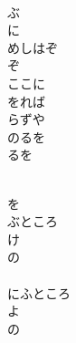 \documentclass[10pt,b5j]{tarticle} %
\begin{document}
\vspace{1.5em} %
\newcommand{\linespace}{0.5em} %
\newcommand{\blocksize}{0.5\hsize} %
\newcommand{\itemmargin}{3em} %
\begin{enumerate} %
    \setlength{\itemindent}{\itemmargin} %
    \begin{minipage}[c]{\blocksize}
    
        \vspace{\linespace}
        \item~\\
        ぶ\\
        に\\
        めしはぞ\\
        ぞ\\
        ここに\\
        をれば\\
        らずや\\
        のるを\\
        るを
        
    \end{minipage}
    \begin{minipage}[c]{\blocksize}
        
        \vspace{\linespace}
        \item~\\
        を\\
        ぶところ\\
        け\\
        の\\
        \\
        にふところ\\
        よ\\
        の\\
        
    \end{minipage}
    \begin{minipage}[c]{\blocksize}
        

\end{minipage}
\end{enumerate}
\end{document}
